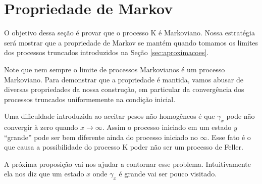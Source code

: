 
\section{Propriedade de Markov}
\label{sec:prop-markov}

O objetivo dessa seção é provar que o processo K é Markoviano. Nossa
estratégia será mostrar que a propriedade de Markov se mantém quando
tomamos os limites dos processos truncados introduzidos na Seção
\ref{sec:aproximacoes}.

Note que nem sempre o limite de processos Markovianos é um processo
Markoviano. Para demonstrar que a propriedade é mantida, vamos abusar
de diversas propriedades da nossa construção, em particular da
convergência dos processos truncados uniformemente na condição
inicial.




Uma dificuldade introduzida ao aceitar pesos não homogêneos é que
$\gamma_x$ pode não convergir à zero quando $x \to \infty$. Assim o
processo iniciado em um estado $y$ ``grande'' pode ser bem diferente
ainda do processo iniciado no $\infty$. Esse fato é o que causa a
possibilidade do processo K poder não ser um processo de Feller.

A próxima proposição vai nos ajudar a contornar esse
problema. Intuitivamente ela nos diz que um estado $x$ onde $\gamma_x$
é grande vai ser pouco visitado.


